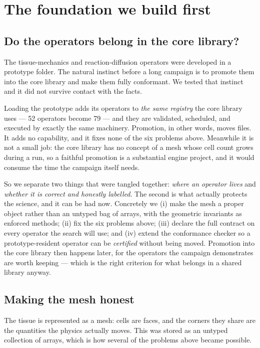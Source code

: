 \documentclass[11pt]{article}
\begin{document}
\section{The foundation we build first}
\label{sec:foundation}

\subsection{Do the operators belong in the core library?}

The tissue-mechanics and reaction-diffusion operators were developed in a prototype folder. The
natural instinct before a long campaign is to promote them into the core library and make them
fully conformant. We tested that instinct and it did not survive contact with the facts.

Loading the prototype adds its operators to \emph{the same registry} the core library uses ---
52 operators become 79 --- and they are validated, scheduled, and executed by exactly the same
machinery. Promotion, in other words, moves files. It adds no capability, and it fixes none of
the six problems above. Meanwhile it is not a small job: the core library has no concept of a
mesh whose cell count grows during a run, so a faithful promotion is a substantial engine
project, and it would consume the time the campaign itself needs.

So we separate two things that were tangled together: \emph{where an operator lives} and
\emph{whether it is correct and honestly labelled}. The second is what actually protects the
science, and it can be had now. Concretely we (i) make the mesh a proper object rather than an
untyped bag of arrays, with the geometric invariants as enforced methods; (ii) fix the six
problems above; (iii) declare the full contract on every operator the search will use; and (iv)
extend the conformance checker so a prototype-resident operator can be \emph{certified} without
being moved. Promotion into the core library then happens later, for the operators the campaign
demonstrates are worth keeping --- which is the right criterion for what belongs in a shared
library anyway.

\subsection{Making the mesh honest}

The tissue is represented as a mesh: cells are faces, and the corners they share are the
quantities the physics actually moves. This was stored as an untyped collection of arrays,
which is how several of the problems above became possible.
\end{document}
